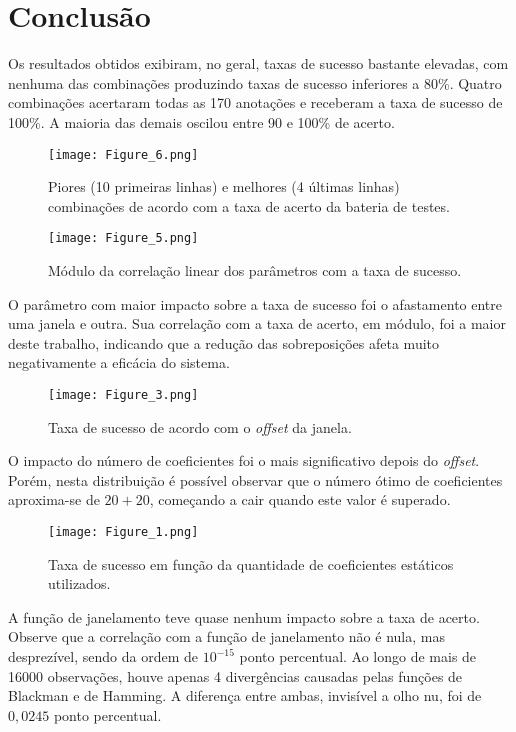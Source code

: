 \documentclass[12pt]{diazessay} %
\begin{document}

\section*{Conclusão}

Os resultados obtidos exibiram, no geral, taxas de sucesso bastante elevadas, com nenhuma das combinações produzindo taxas de sucesso inferiores a 80\%.
Quatro combinações acertaram todas as 170 anotações e receberam a taxa de sucesso de 100\%.
A maioria das demais oscilou entre 90 e 100\% de acerto.

\begin{figure}
	\centering
	\texttt{[image: Figure\_6.png]}
	\caption{Piores (10 primeiras linhas) e melhores (4 últimas linhas) combinações de acordo com a taxa de acerto da bateria de testes.}
\end{figure}

\begin{figure}
	\centering
	\texttt{[image: Figure\_5.png]}
	\caption{Módulo da correlação linear dos parâmetros com a taxa de sucesso.}
\end{figure}

O parâmetro com maior impacto sobre a taxa de sucesso foi o afastamento entre uma janela e outra.
Sua correlação com a taxa de acerto, em módulo, foi a maior deste trabalho, indicando que a redução das sobreposições afeta muito negativamente a eficácia do sistema.

\begin{figure}
	\centering
	\texttt{[image: Figure\_3.png]}
	\caption{Taxa de sucesso de acordo com o \emph{offset} da janela.}
\end{figure}

O impacto do número de coeficientes foi o mais significativo depois do \emph{offset}.
Porém, nesta distribuição é possível observar que o número ótimo de coeficientes aproxima-se de $20 + 20$, começando a cair quando este valor é superado.

\begin{figure}
	\centering
	\texttt{[image: Figure\_1.png]}
	\caption{Taxa de sucesso em função da quantidade de coeficientes estáticos utilizados.}
\end{figure}

A função de janelamento teve quase nenhum impacto sobre a taxa de acerto.
Observe que a correlação com a função de janelamento não é nula, mas desprezível, sendo da ordem de $10^{-15}$ ponto percentual.
Ao longo de mais de 16000 observações, houve apenas 4 divergências causadas pelas funções de Blackman e de Hamming.
A diferença entre ambas, invisível a olho nu, foi de $0,0245$ ponto percentual.
\end{document}
